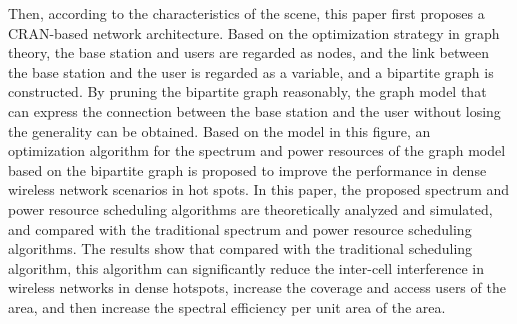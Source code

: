{Then, according to the characteristics of the scene, this paper first proposes a CRAN-based network architecture. Based on the optimization strategy in graph theory, the base station and users are regarded as nodes, and the link between the base station and the user is regarded as a variable, and a bipartite graph is constructed.
By pruning the bipartite graph reasonably, the graph model that can express the connection between the base station and the user without losing the generality can be obtained.
Based on the model in this figure, an optimization algorithm for the spectrum and power resources of the graph model based on the bipartite graph is proposed to improve the performance in dense wireless network scenarios in hot spots.
In this paper, the proposed spectrum and power resource scheduling algorithms are theoretically analyzed and simulated, and compared with the traditional spectrum and power resource scheduling algorithms.
The results show that compared with the traditional scheduling algorithm, this algorithm can significantly reduce the inter-cell interference in wireless networks in dense hotspots, increase the coverage and access users of the area, and then increase the spectral efficiency per unit area of ​​the area.
}


\makecover
\clearpage
